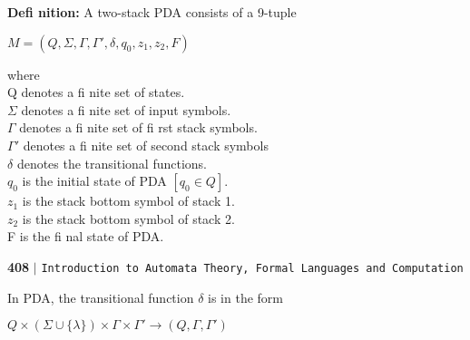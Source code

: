 \documentclass{article}
\begin{document}
\vspace*{0.3cm}
\textbf{Defi nition:} A two-stack PDA consists of a 9-tuple\\

\begin{center}
  $M = (Q, \Sigma, \Gamma, \Gamma', \delta, q_0, z_1, z_2, F)$ \\
\end{center}


where\\
\hspace*{1cm} Q denotes a fi nite set of states.\\
\hspace*{1cm} $\Sigma$ denotes a fi nite set of input symbols.\\
\hspace*{1cm} $\Gamma$ denotes a fi nite set of fi rst stack symbols.\\
\hspace*{1cm} $\Gamma '$ denotes a fi nite set of second stack symbols\\
\hspace*{1cm} $\delta$ denotes the transitional functions.\\
\hspace*{1cm} $q_0$ is the initial state of PDA $[q_0 \in Q]$.\\
\hspace*{1cm} $z_1$ is the stack bottom symbol of stack 1.\\
\hspace*{1cm} $z_2$ is the stack bottom symbol of stack 2.\\
\hspace*{1cm} F is the fi nal state of PDA.\\

\newpage
\begin{flushleft}
    \textbf{408}\hspace*{0.1cm} \textbf{$|$} \hspace*{0.1cm} \texttt{Introduction to Automata Theory, Formal Languages and Computation}
  \end{flushleft}

\vspace*{0.5cm}
In PDA, the transitional function $\delta$ is in the form\\

\begin{center}
  $Q \times (\Sigma \cup \{\lambda\}) \times \Gamma \times \Gamma ' \rightarrow (Q, \Gamma, \Gamma ')$ \\
\end{center}
\end{document}
